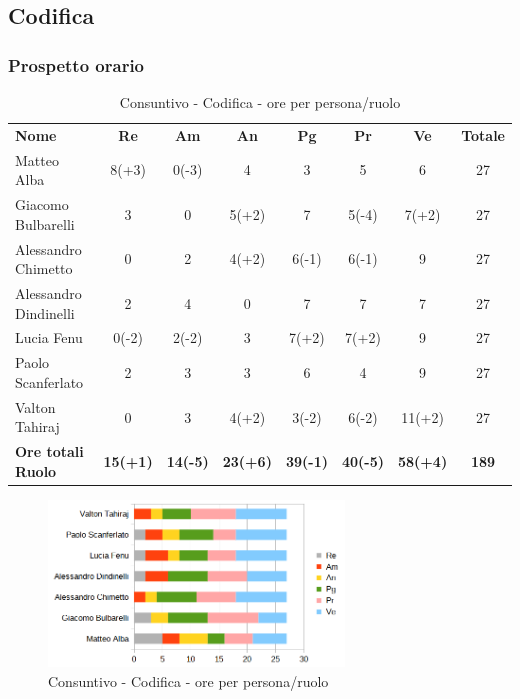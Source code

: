 \newpage

\subsection{Codifica }

\subsubsection{Prospetto orario}
\begin{table} [h!]
	\begin{center}
		\begin{tabular} { m{3.5cm} c c c c c c c }
			\rowcolor{lightgray}
			\textbf{Nome} & \textbf{Re} & \textbf{Am} & \textbf{An} & \textbf{Pg} & \textbf{Pr} & \textbf{Ve} & \textbf{Totale} \\
			Matteo Alba               & 8(+3)      & 0(-3)    & 4      & 3  & 5  & 6      & 27 \\
			Giacomo Bulbarelli        & 3     & 0     & 5(+2)  & 7  & 5(-4)  & 7(+2)      & 27 \\
			Alessandro Chimetto       & 0     & 2    & 4(+2)       & 6(-1)  & 6(-1)  & 9     & 27 \\
			Alessandro Dindinelli     & 2     & 4    & 0       & 7  & 7  & 7  & 27 \\
			Lucia Fenu                & 0(-2)  & 2(-2)  & 3      & 7(+2)   & 7(+2)   & 9      & 27 \\
			Paolo Scanferlato         & 2      & 3      & 3      & 6       & 4       & 9      & 27 \\
			Valton Tahiraj            & 0      & 3      & 4(+2)  & 3(-2)   & 6(-2)   & 11(+2) & 27\\
			\textbf{Ore totali Ruolo} & \textbf{15(+1)} & \textbf{14(-5)} & \textbf{23(+6)} & \textbf{39(-1)}  & \textbf{40(-5)}  & \textbf{58(+4)} & \textbf{189}\\
		\end{tabular}
		\caption{Consuntivo - Codifica  - ore per persona/ruolo}
	\end{center}
\end{table}
	\begin{figure} [h!]
	\centering
	\includegraphics[width=0.7\textwidth]{res/img/grafici/consuntivo-barre-tb.png}
	\caption{Consuntivo - Codifica  -  ore per persona/ruolo} 
\end{figure}
\newpage
